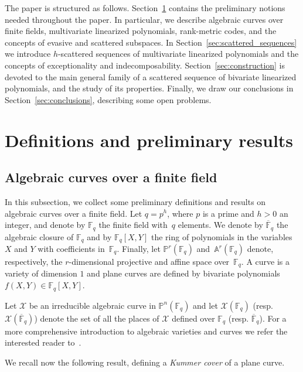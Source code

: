 The paper is structured as follows. Section~\ref{sec:preliminaries} contains the preliminary notions needed throughout the paper. In particular, we  describe algebraic curves over finite fields, multivariate linearized polynomials, rank-metric codes, and the concepts of evasive and scattered subspaces. In Section~\ref{sec:scattered_sequences} we introduce $h$-scattered sequences of multivariate linearized polynomials and the concepts of exceptionality and indecomposability. Section~\ref{sec:construction} is devoted to the main general family of a scattered sequence of bivariate linearized polynomials, and the study of its properties. Finally, we draw our conclusions in  Section~\ref{sec:conclusions}, describing some open problems.

\section{Definitions and preliminary results}\label{sec:preliminaries}

\subsection{Algebraic curves over a finite field}\label{sec:curves}

In this subsection, we collect some preliminary definitions and results on algebraic curves over a finite field. Let $q=p^h$, where $p$ is a prime and $h>0$ an integer, and denote by $\mathbb{F}_q$ the finite field with~$q$ elements. We denote by $\overline{\mathbb{F}}_q$ the algebraic closure of $\mathbb{F}_q$ and by $\mathbb{F}_q[X,Y]$ the ring of polynomials in the variables $X$ and $Y$ with coefficients in~$\mathbb{F}_q$. Finally, let $\mathbb{P}^r(\mathbb{F}_q)$ and~$\mathbb{A}^r(\mathbb{F}_q)$ denote, respectively, the $r$-dimensional projective and affine space over~$\mathbb{F}_q$.
A curve is a variety of dimension $1$ and plane curves are defined by bivariate polynomials~$f(X,Y)\in \mathbb{F}_q[X,Y]$.

Let $\mathcal{X}$ be an irreducible algebraic curve in $\mathbb{P}^n(\mathbb{F}_q)$ and
let $\mathcal{X}(\mathbb{F}_q)$ (resp. $\mathcal{X}(\overline{\mathbb{F}}_q)$) denote the set of all the places of $\mathcal{X}$ defined over $\mathbb{F}_q$ (resp. $\overline{\mathbb{F}}_q$). For a more comprehensive introduction to algebraic varieties and curves we refer the interested reader to~\cite{HKT,Hartshorne,Stichtenoth}. 

We recall now the following result, defining a \emph{Kummer cover} of a plane curve.


